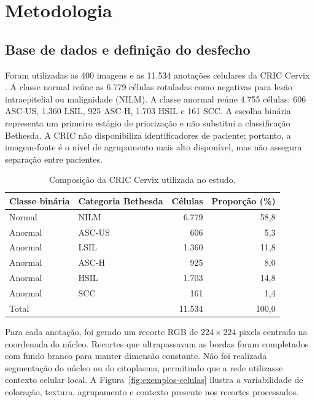 ﻿\section{Metodologia}

\subsection{Base de dados e definição do desfecho}

Foram utilizadas as 400 imagens e as 11.534 anotações celulares da CRIC
Cervix \cite{rezende2021cric}. A classe normal reúne as 6.779 células rotuladas
como negativas para lesão intraepitelial ou malignidade (NILM). A classe
anormal reúne 4.755 células: 606 ASC-US, 1.360 LSIL, 925 ASC-H, 1.703 HSIL e
161 SCC. A escolha binária representa um primeiro estágio de priorização e não
substitui a classificação Bethesda. A CRIC não disponibiliza identificadores
de paciente; portanto, a imagem-fonte é o nível de agrupamento mais alto
disponível, mas não assegura separação entre pacientes.

\begin{table}[ht]
\centering
\caption{Composição da CRIC Cervix utilizada no estudo.}
\label{tab:composicao-cric}
\begin{tabular}{llrr}
\toprule
Classe binária & Categoria Bethesda & Células & Proporção (\%) \\
\midrule
Normal & NILM & 6.779 & 58,8 \\
Anormal & ASC-US & 606 & 5,3 \\
Anormal & LSIL & 1.360 & 11,8 \\
Anormal & ASC-H & 925 & 8,0 \\
Anormal & HSIL & 1.703 & 14,8 \\
Anormal & SCC & 161 & 1,4 \\
\midrule
\multicolumn{2}{l}{Total} & 11.534 & 100,0 \\
\bottomrule
\end{tabular}
\end{table}

Para cada anotação, foi gerado um recorte RGB de $224\times224$ pixels centrado
na coordenada do núcleo. Recortes que ultrapassavam as bordas foram completados
com fundo branco para manter dimensão constante. Não foi realizada segmentação
do núcleo ou do citoplasma, permitindo que a rede utilizasse contexto celular
local. A Figura~\ref{fig:exemplos-celulas} ilustra a variabilidade de coloração,
textura, agrupamento e contexto presente nos recortes processados.

